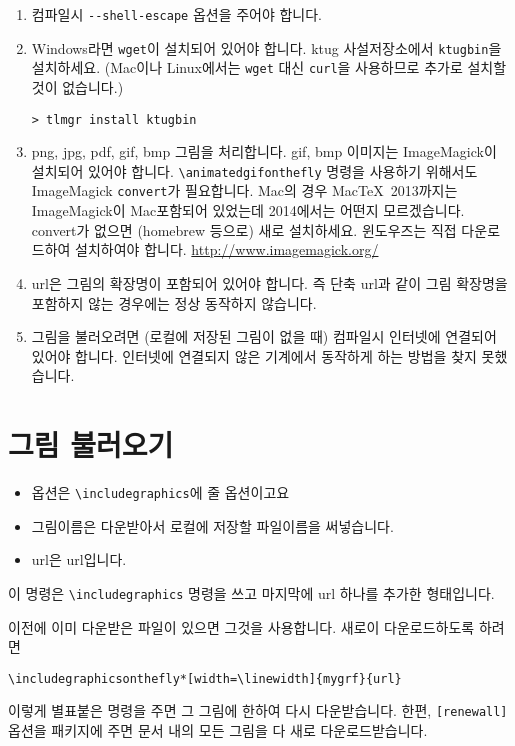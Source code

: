 \documentclass[b5paper,nanum]{oblivoir}
\def\cs#1{\texttt{\textbackslash #1}}
\begin{document}
\begin{enumerate}\firmlist
\item    컴파일시 \verb|--shell-escape| 옵션을 주어야 합니다.
\item    Windows라면 \texttt{wget}이 설치되어 있어야 합니다. ktug 사설저장소에서 \texttt{ktugbin}을 설치하세요. (Mac이나 Linux에서는 \verb|wget| 대신 \verb|curl|을 사용하므로 추가로 설치할 것이 없습니다.)
\begin{verbatim}
> tlmgr install ktugbin
\end{verbatim}

\item    png, jpg, pdf, gif, bmp 그림을 처리합니다. gif, bmp 이미지는 ImageMagick이 설치되어 있어야 합니다. \cs{animatedgifonthefly} 명령을 사용하기 위해서도 ImageMagick \verb|convert|가 필요합니다.
Mac의 경우 Mac\TeX\ 2013까지는 ImageMagick이 Mac 포함되어 있었는데 2014에서는 어떤지 모르겠습니다. convert가 없으면 (homebrew 등으로) 새로 설치하세요. 윈도우즈는 직접 다운로드하여 설치하여야 합니다. \url{http://www.imagemagick.org/}

\item    url은 그림의 확장명이 포함되어 있어야 합니다. 즉 단축 url과 같이 그림 확장명을 포함하지 않는 경우에는 정상 동작하지 않습니다.
\item    그림을 불러오려면 (로컬에 저장된 그림이 없을 때) 컴파일시 인터넷에 연결되어 있어야 합니다. 인터넷에 연결되지 않은 기계에서 동작하게 하는 방법을 찾지 못했습니다.
\end{enumerate}

\section{그림 불러오기}

\begin{boxedverbatim}
\end{boxedverbatim}

\begin{itemize}\firmlist
\item 옵션은 \cs{includegraphics}에 줄 옵션이고요
\item 그림이름은 다운받아서 로컬에 저장할 파일이름을  써넣습니다.
\item url은 url입니다.
\end{itemize}

이 명령은 \cs{includegraphics} 명령을 쓰고 마지막에 url 하나를 추가한 형태입니다.

이전에 이미 다운받은 파일이 있으면 그것을 사용합니다.
새로이 다운로드하도록 하려면
\begin{verbatim}
\includegraphicsonthefly*[width=\linewidth]{mygrf}{url}
\end{verbatim}
이렇게 별표붙은 명령을 주면 그 그림에 한하여 다시 다운받습니다.
한편, \texttt{[renewall]} 옵션을 패키지에 주면 문서 내의 모든 그림을 다 새로 다운로드받습니다.
\end{document}
